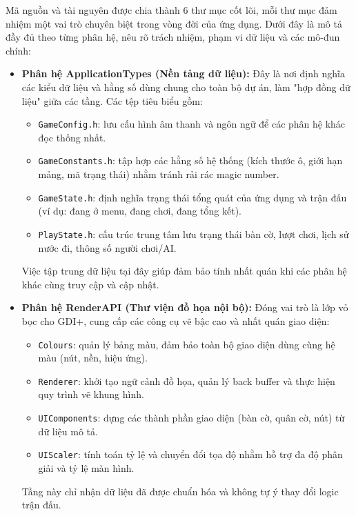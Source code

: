\noindent \indent Mã nguồn và tài nguyên được chia thành 6 thư mục cốt lõi, mỗi thư mục đảm nhiệm một vai trò chuyên biệt trong vòng đời của ứng dụng. Dưới đây là mô tả đầy đủ theo từng phân hệ, nêu rõ trách nhiệm, phạm vi dữ liệu và các mô-đun chính:

\begin{itemize}
    \item \textbf{Phân hệ ApplicationTypes (Nền tảng dữ liệu):}
    Đây là nơi định nghĩa các kiểu dữ liệu và hằng số dùng chung cho toàn bộ dự án, làm "hợp đồng dữ liệu" giữa các tầng. Các tệp tiêu biểu gồm:
    \begin{itemize}
        \item \texttt{GameConfig.h}: lưu cấu hình âm thanh và ngôn ngữ để các phân hệ khác đọc thống nhất.
        \item \texttt{GameConstants.h}: tập hợp các hằng số hệ thống (kích thước ô, giới hạn mảng, mã trạng thái) nhằm tránh rải rác magic number.
        \item \texttt{GameState.h}: định nghĩa trạng thái tổng quát của ứng dụng và trận đấu (ví dụ: đang ở menu, đang chơi, đang tổng kết).
        \item \texttt{PlayState.h}: cấu trúc trung tâm lưu trạng thái bàn cờ, lượt chơi, lịch sử nước đi, thông số người chơi/AI.
    \end{itemize}
    Việc tập trung dữ liệu tại đây giúp đảm bảo tính nhất quán khi các phân hệ khác cùng truy cập và cập nhật.

    \item \textbf{Phân hệ RenderAPI (Thư viện đồ họa nội bộ):}
    Đóng vai trò là lớp vỏ bọc cho GDI+, cung cấp các công cụ vẽ bậc cao và nhất quán giao diện:
    \begin{itemize}
        \item \texttt{Colours}: quản lý bảng màu, đảm bảo toàn bộ giao diện dùng cùng hệ màu (nút, nền, hiệu ứng).
        \item \texttt{Renderer}: khởi tạo ngữ cảnh đồ họa, quản lý back buffer và thực hiện quy trình vẽ khung hình.
        \item \texttt{UIComponents}: dựng các thành phần giao diện (bàn cờ, quân cờ, nút) từ dữ liệu mô tả.
        \item \texttt{UIScaler}: tính toán tỷ lệ và chuyển đổi tọa độ nhằm hỗ trợ đa độ phân giải và tỷ lệ màn hình.
    \end{itemize}
    Tầng này chỉ nhận dữ liệu đã được chuẩn hóa và không tự ý thay đổi logic trận đấu.


\end{itemize}
